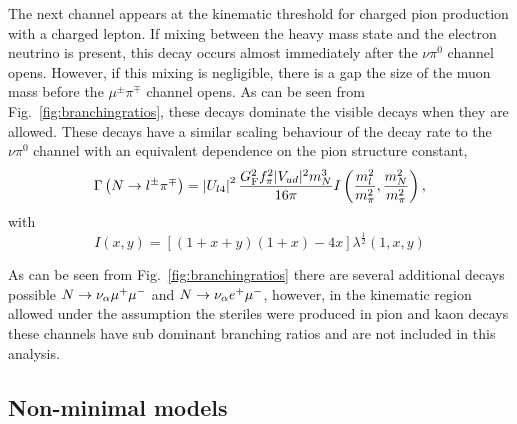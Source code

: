 \documentclass[11pt, a4paper]{article}
\newcommand{\reffig}[1]{Fig.~\ref{#1}}
\def\ster{\ensuremath N}
\begin{document}
The next channel appears at the kinematic threshold for charged pion production
with a charged lepton. If mixing between the heavy mass state and the electron
neutrino is present, this decay occurs almost immediately after the $\nu\pi^0$
channel opens. However, if this mixing is negligible, there is a gap the size of
the muon mass before the $\mu^\pm\pi^\mp$ channel opens. As can be seen from
\reffig{fig:branchingratios}, these decays dominate the visible decays when
they are allowed. These decays have a similar scaling behaviour of the decay
rate to the $\nu\pi^0$ channel with an equivalent dependence on the pion
structure constant,
%
\[ \Gamma\left(\ster\to l^\pm\pi^\mp\right) =
	\left|U_{l4}\right|^2\frac{G_\text{F}^2f_\pi^2 |V_{ud}|^2  m_\ster^3}{16\pi}I\left(\frac{m_l^2}{m_\pi^2} , \frac{m_\ster^2}{m_\pi^2}\right) ,
\]
with 
\[
	I(x,y) = \left[ \left( 1+x+y\right) \left(1+x\right) -4 x\right] \lambda^\frac{1}{2}\left(1,x,y\right)
\]

As can be seen from \reffig{fig:branchingratios} there are several additional
decays possible $\ster\rightarrow \nu_\alpha \mu^+ \mu^-$ and $\ster
\rightarrow \nu_\alpha e^+ \mu^-$, however, in the kinematic region allowed
under the assumption the steriles were produced in pion and kaon decays these
channels have sub dominant branching ratios and are not included in this
analysis.

\subsection{Non-minimal models}
\end{document}
